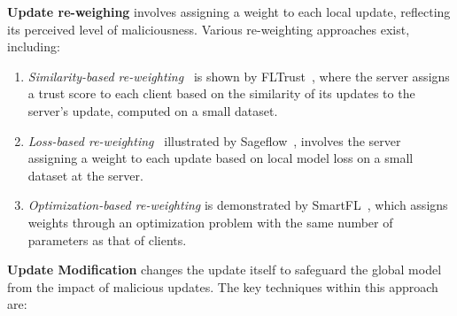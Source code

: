 \noindent\textbf{Update re-weighing} 
involves assigning a weight to each local update, reflecting its perceived level of maliciousness. Various re-weighting approaches exist, including:
\begin{enumerate}[leftmargin=*, label=\alph*), wide]
    \item \emph{Similarity-based re-weighting~\cite{awan2021contra, cao2020fltrust}} is shown by FLTrust~\cite{cao2020fltrust}, where the server assigns a trust score to each client based on the similarity of its updates to the server's update, computed on a small dataset.
    \item \emph{Loss-based re-weighting~\cite{park2021sageflow, li2020learning}} illustrated by Sageflow~\cite{park2021sageflow}, involves the server assigning a weight to each update based on local model loss on a small dataset at the server.
    \item \emph{Optimization-based re-weighting} is demonstrated by SmartFL~\cite{xie2022robust}, which assigns weights through an optimization problem with the same number of parameters as that of clients.
\end{enumerate}
\noindent\textbf{Update Modification} changes the update itself to safeguard the global model from the impact of malicious updates. The key techniques within this approach are:
